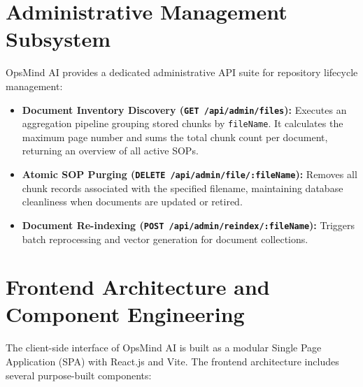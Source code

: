 \section{Administrative Management Subsystem}
\label{sec:impl_admin_subsystem}

OpsMind AI provides a dedicated administrative API suite for repository lifecycle management:

\begin{itemize}
    \item \textbf{Document Inventory Discovery (\texttt{GET /api/admin/files}):} Executes an aggregation pipeline grouping stored chunks by \texttt{fileName}. It calculates the maximum page number and sums the total chunk count per document, returning an overview of all active SOPs.
    \item \textbf{Atomic SOP Purging (\texttt{DELETE /api/admin/file/:fileName}):} Removes all chunk records associated with the specified filename, maintaining database cleanliness when documents are updated or retired.
    \item \textbf{Document Re-indexing (\texttt{POST /api/admin/reindex/:fileName}):} Triggers batch reprocessing and vector generation for document collections.
\end{itemize}

\section{Frontend Architecture and Component Engineering}
\label{sec:impl_frontend}

The client-side interface of OpsMind AI is built as a modular Single Page Application (SPA) with React.js and Vite. The frontend architecture includes several purpose-built components:

